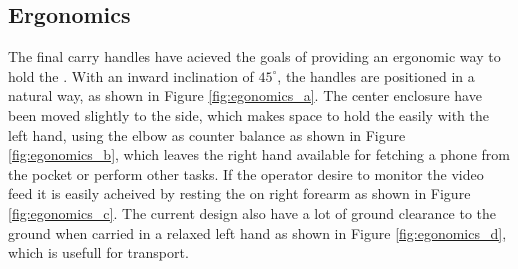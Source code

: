 \subsection{Ergonomics}
The final carry handles have acieved the goals of providing an ergonomic way to hold the \sr.
With an inward inclination of $45^{\circ}$, the handles are positioned in a natural way, as shown in Figure \ref{fig:egonomics_a}.
The center enclosure have been moved slightly to the side, which makes space to hold the \sr easily with the left hand, using the elbow as counter balance as shown in Figure \ref{fig:egonomics_b}, which leaves the right hand available for fetching a phone from the pocket or perform other tasks.
If the operator desire to monitor the video feed it is easily acheived by resting the \sr on right forearm as shown in Figure \ref{fig:egonomics_c}.
The current design also have a lot of ground clearance to the ground when carried in a relaxed left hand as shown in Figure \ref{fig:egonomics_d}, which is usefull for transport.


